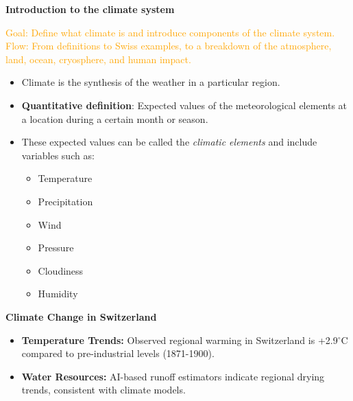 \documentclass[fontsize=8pt, a4paper, landscape, fleqn]{scrartcl}
\renewcommand{\section}[1]{%
    \noindent\colorbox{sectioncolor}{%
        \parbox{\dimexpr\columnwidth-2\fboxsep}{\color{white}\textbf{#1}}}%
    \vspace{0.5mm}%
}
\renewcommand{\subsection}[1]{%
    \noindent\colorbox{subsectioncolor}{%
        \parbox{\dimexpr\columnwidth-2\fboxsep}{\color{white}\textbf{#1}}}%
    \vspace{0.5mm}%
}
\begin{document}
\begin{multicols*}{3}[\raggedcolumns]
\section{Introduction to the climate system}
\noindent\textcolor{orange}{ Goal: Define what climate is and introduce components of the climate system.\\
Flow: From definitions to Swiss examples, to a breakdown of the atmosphere, land, ocean, cryosphere, and human impact.
}
\begin{itemize}
    \item Climate is the synthesis of the weather in a particular region.
    \item \textbf{Quantitative definition}: Expected values of the meteorological elements at a location during a certain month or season.
    \item These expected values can be called the \textit{climatic elements} and include variables such as:
    \begin{itemize}
        \item Temperature
        \item Precipitation
        \item Wind
        \item Pressure
        \item Cloudiness
        \item Humidity
    \end{itemize}
\end{itemize}

\subsection{Climate Change in Switzerland}
\begin{itemize}
    \item \textbf{Temperature Trends:} Observed regional warming in Switzerland is +2.9$^{\circ}$C compared to pre-industrial levels (1871-1900).
    \item \textbf{Water Resources:} AI-based runoff estimators indicate regional drying trends, consistent with climate models.
\end{itemize}


\end{multicols*}
\end{document}
